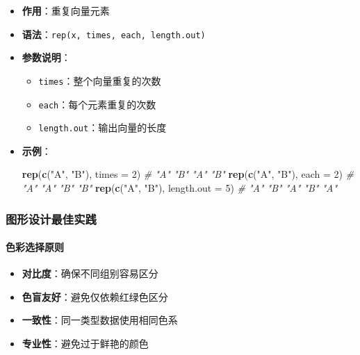 \documentclass[
  twoside]{book}
\newenvironment{Shaded}{\begin{snugshade}}{\end{snugshade}}
\newcommand{\AttributeTok}[1]{\textcolor[rgb]{0.13,0.29,0.53}{#1}}
\newcommand{\CommentTok}[1]{\textcolor[rgb]{0.56,0.35,0.01}{\textit{#1}}}
\newcommand{\DecValTok}[1]{\textcolor[rgb]{0.00,0.00,0.81}{#1}}
\newcommand{\FunctionTok}[1]{\textcolor[rgb]{0.13,0.29,0.53}{\textbf{#1}}}
\newcommand{\NormalTok}[1]{#1}
\newcommand{\StringTok}[1]{\textcolor[rgb]{0.31,0.60,0.02}{#1}}
\providecommand{\tightlist}{%
  \setlength{\itemsep}{0pt}\setlength{\parskip}{0pt}}
\begin{document}
\begin{itemize}
\item
  \textbf{作用}：重复向量元素
\item
  \textbf{语法}：\texttt{rep(x,\ times,\ each,\ length.out)}
\item
  \textbf{参数说明}：

  \begin{itemize}
  \tightlist
  \item
    \texttt{times}：整个向量重复的次数
  \item
    \texttt{each}：每个元素重复的次数
  \item
    \texttt{length.out}：输出向量的长度
  \end{itemize}
\item
  \textbf{示例}：

\begin{Shaded}
\begin{Highlighting}[]
\FunctionTok{rep}\NormalTok{(}\FunctionTok{c}\NormalTok{(}\StringTok{"A"}\NormalTok{, }\StringTok{"B"}\NormalTok{), }\AttributeTok{times =} \DecValTok{2}\NormalTok{)    }\CommentTok{\# "A" "B" "A" "B"}
\FunctionTok{rep}\NormalTok{(}\FunctionTok{c}\NormalTok{(}\StringTok{"A"}\NormalTok{, }\StringTok{"B"}\NormalTok{), }\AttributeTok{each =} \DecValTok{2}\NormalTok{)     }\CommentTok{\# "A" "A" "B" "B"}
\FunctionTok{rep}\NormalTok{(}\FunctionTok{c}\NormalTok{(}\StringTok{"A"}\NormalTok{, }\StringTok{"B"}\NormalTok{), }\AttributeTok{length.out =} \DecValTok{5}\NormalTok{) }\CommentTok{\# "A" "B" "A" "B" "A"}
\end{Highlighting}
\end{Shaded}
\end{itemize}

\hypertarget{ux56feux5f62ux8bbeux8ba1ux6700ux4f73ux5b9eux8df5}{%
\subsubsection{图形设计最佳实践}\label{ux56feux5f62ux8bbeux8ba1ux6700ux4f73ux5b9eux8df5}}

\hypertarget{ux8272ux5f69ux9009ux62e9ux539fux5219}{%
\paragraph{色彩选择原则}\label{ux8272ux5f69ux9009ux62e9ux539fux5219}}

\begin{itemize}
\tightlist
\item
  \textbf{对比度}：确保不同组别容易区分
\item
  \textbf{色盲友好}：避免仅依赖红绿色区分
\item
  \textbf{一致性}：同一类型数据使用相同色系
\item
  \textbf{专业性}：避免过于鲜艳的颜色
\end{itemize}
\end{document}
